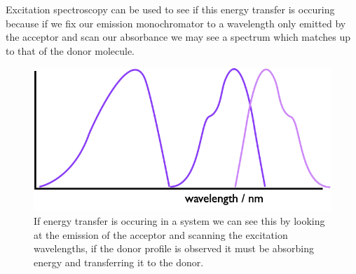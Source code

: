 \documentclass[
]{book}
\begin{document}
Excitation spectroscopy can be used to see if this energy transfer is occuring because if we fix our emission monochromator to a wavelength only emitted by the acceptor and scan our absorbance we may see a spectrum which matches up to that of the donor molecule.

\begin{figure}

{\centering \includegraphics[width=0.6\linewidth]{images/FRET2} 

}

\caption{If energy transfer is occuring in a system we can see this by looking at the emission of the acceptor and scanning the excitation wavelengths, if the donor profile is observed it must be absorbing energy and transferring it to the donor.}\label{fig:FRET2}
\end{figure}

  
\end{document}
